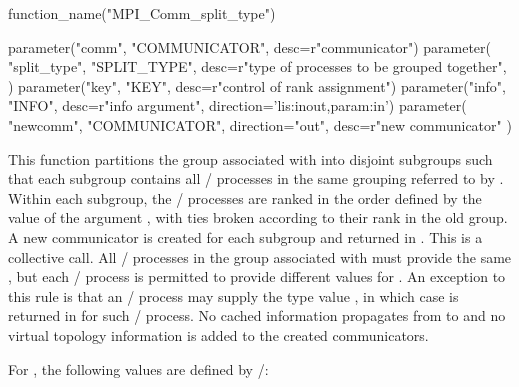 %
\begin{mpi-binding}
    function_name("MPI_Comm_split_type")
    
    parameter("comm", "COMMUNICATOR", desc=r"communicator")
    parameter(
        "split_type",
        "SPLIT_TYPE",
        desc=r"type of processes to be grouped together",
    )
    parameter("key", "KEY", desc=r"control of rank assignment")
    parameter("info", "INFO", desc=r"info argument", direction='lis:inout,param:in')
    parameter(
        "newcomm", "COMMUNICATOR", direction="out", desc=r"new communicator"
    )
\end{mpi-binding}

\noindent This function partitions the group associated with
 into disjoint subgroups such that each subgroup contains
all \MPI/ processes in the same grouping referred to by .
Within each subgroup, the \MPI/ processes are ranked in the order
defined by the value of the argument , with ties broken
according to their rank in the old group. A new communicator is
created for each subgroup and returned in . This is a
collective call. All \MPI/ processes in the group associated with
 must provide the same , but each
\MPI/ process is permitted to provide different values for .
An exception to this rule is that an \MPI/ process may supply the type
value , in which case  is
returned in  for such \MPI/ process.
No cached information propagates from  to  and no
virtual topology information is added to the created communicators.


For , the following values are defined by \MPI/:

